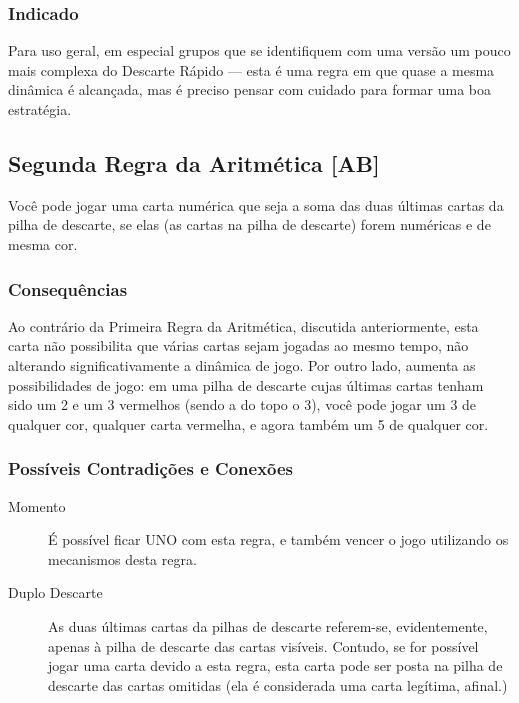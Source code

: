 \subsubsection{Indicado} 

Para uso geral, em especial grupos que se identifiquem com uma versão um pouco mais complexa do Descarte Rápido --- esta é uma regra em que quase a mesma dinâmica é alcançada, mas é preciso pensar com cuidado para formar uma boa estratégia.

\subsection{Segunda Regra da Aritmética [AB]}

Você pode jogar uma carta numérica que seja a soma das duas últimas cartas da pilha de descarte, se elas (as cartas na pilha de descarte) forem numéricas e de mesma cor.

\subsubsection{Consequências}

Ao contrário da Primeira Regra da Aritmética, discutida anteriormente, esta carta não possibilita que várias cartas sejam jogadas ao mesmo tempo, não alterando significativamente a dinâmica de jogo. Por outro lado, aumenta as possibilidades de jogo: em uma pilha de descarte cujas últimas cartas tenham sido um 2 e um 3 vermelhos (sendo a do topo o 3), você pode jogar um 3 de qualquer cor, qualquer carta vermelha, e agora também um 5 de qualquer cor.

\subsubsection{Possíveis Contradições e Conexões}

\begin{description}
\item[Momento]{É possível ficar UNO com esta regra, e também vencer o jogo utilizando os mecanismos desta regra.}
\item[Duplo Descarte]{As duas últimas cartas da pilhas de descarte referem-se, evidentemente, apenas à pilha de descarte das cartas visíveis. Contudo, se for possível jogar uma carta devido a esta regra, esta carta pode ser posta na pilha de descarte das cartas omitidas (ela é considerada uma carta legítima, afinal.)}
\end{description}


